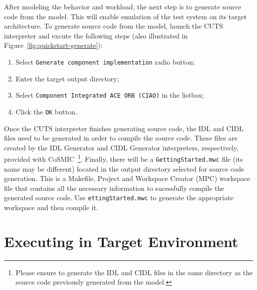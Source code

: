 After modeling the behavior and workload, the next step is to 
generate source code from the model. This will enable emulation 
of the test system on its target architecture. To generate source 
code from the model, launch the CUTS interpreter and excute the 
following steps (also illustrated in Figure~\ref{fig:quickstart-generate}):
\begin{enumerate}
  \item Select \texttt{Generate component implementation} radio button;
  \item Enter the target output directory;
  \item Select \texttt{Component Integrated ACE ORB (CIAO)} in the listbox;
  \item Click the \texttt{OK} button.
\end{enumerate}
Once the CUTS interpreter finishes generating source code, the IDL and CIDL 
files need to be generated in order to compile the source code. These files 
are created by the IDL Generator and CIDL Generator interpreters, respectively, 
provided with CoSMIC~\footnote{Please ensure to generate the IDL and CIDL 
files in the same directory as the source code previously generated 
from the model.}. Finally, there will be a \texttt{GettingStarted.mwc} 
file (its name may be different) located in the output directory selected 
for source code generation. This is a Makefile, Project and Workspace Creator 
(MPC) workspace file that contains all the necessary information to sucessfully 
compile the generated source code. Use \texttt{ettingStarted.mwc} to generate 
the appropriate workspace and then compile it.

\section{Executing in Target Environment}
\label{sec:quickstart-execution}

